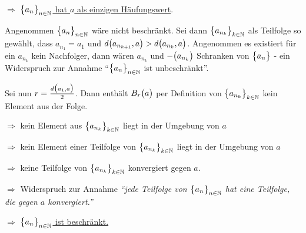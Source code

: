 \documentclass{scrreprt}
\begin{document}
\begin{itemize}
  $\Rightarrow$ \underline{$\qty\big{a_n}_{n \in \mathbb{N}}$ hat $a$ als
    einzigen Häufungswert}.

  Angenommen $\qty\big{a_n}_{n \in \mathbb{N}}$ wäre nicht beschränkt.
  Sei dann $\qty\big{a_{n_k}}_{k \in \mathbb{N}}$ als Teilfolge so gewählt,
  dass $a_{n_1} = a_1$ und $d\qty\big(a_{n_{k + 1}}, a) > d\qty\big(a_{n_k}, a)$.
  Angenommen es existiert für ein $a_{n_k}$ kein Nachfolger, dann wären $a_{n_k}$
  und $-\qty\big(a_{n_k})$ Schranken von $\qty\big{a_n}$ - ein Widerspruch zur
  Annahme ``$\qty\big{a_n}_{n \in \mathbb{N}}$ ist unbeschränkt''.

  Sei nun $r = \frac{d\qty\big(a_1, a)}{2}$.
  Dann enthält $B_r\qty\big(a)$ per Definition von
  $\qty\big{a_{n_k}}_{k \in \mathbb{N}}$ kein Element aus
  der Folge.

  $\Rightarrow$ kein Element aus $\qty\big{a_{n_k}}_{k \in \mathbb{N}}$ liegt
  in der Umgebung von $a$

  $\Rightarrow$ kein Element einer Teilfolge von
  $\qty\big{a_{n_k}}_{k \in \mathbb{N}}$ liegt in der Umgebung von $a$

  $\Rightarrow$ keine Teilfolge von $\qty\big{a_{n_k}}_{k \in \mathbb{N}}$
  konvergiert gegen $a$.

  $\Rightarrow$ Widerspruch zur Annahme \emph{``jede Teilfolge von
    $\qty\big{a_n}_{n \in \mathbb{N}}$ hat eine Teilfolge, die gegen $a$
    konvergiert.''}

  $\Rightarrow$ \underline{$\qty\big{a_n}_{n \in \mathbb{N}}$ ist beschränkt.}
\end{itemize}
\end{document}
